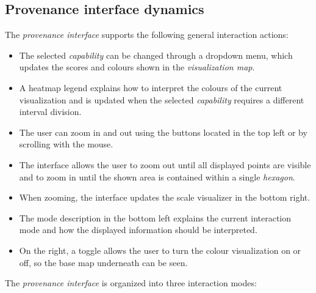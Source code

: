 \documentclass{article}
\begin{document}
\subsection{Provenance interface dynamics}
The \emph{provenance interface} supports the following general interaction actions:
\begin{itemize}
    \item The selected \emph{capability} can be changed through a dropdown menu, which updates the scores and colours shown in the \emph{visualization map}.
    \item A heatmap legend explains how to interpret the colours of the current visualization and is updated when the selected \emph{capability} requires a different interval division.
    \item The user can zoom in and out using the buttons located in the top left or by scrolling with the mouse.
    \item The interface allows the user to zoom out until all displayed points are visible and to zoom in until the shown area is contained within a single \emph{hexagon}.
    \item When zooming, the interface updates the scale visualizer in the bottom right.
    \item The mode description in the bottom left explains the current interaction mode and how the displayed information should be interpreted.
    \item On the right, a toggle allows the user to turn the colour visualization on or off, so the base map underneath can be seen.
\end{itemize}
The \emph{provenance interface} is organized into three interaction modes:
\end{document}

